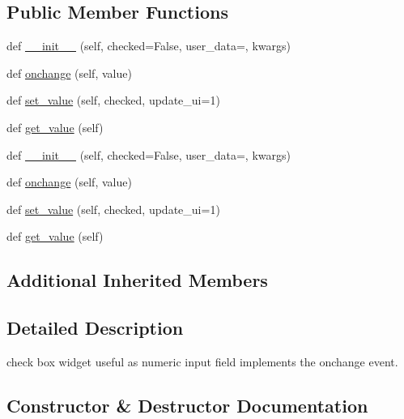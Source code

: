 \subsection*{Public Member Functions}
\begin{DoxyCompactItemize}
\item 
def \hyperlink{classremi_1_1gui_1_1CheckBox_a11912d6beb33eefc0ebc9f2c222b087f}{\+\_\+\+\_\+init\+\_\+\+\_\+} (self, checked=False, user\+\_\+data=\textquotesingle{}\textquotesingle{}, kwargs)
\item 
def \hyperlink{classremi_1_1gui_1_1CheckBox_aed8a3cd38f85743b5fc683c4797f4c97}{onchange} (self, value)
\item 
def \hyperlink{classremi_1_1gui_1_1CheckBox_a82f943b27590b9fb710095405b9107c8}{set\+\_\+value} (self, checked, update\+\_\+ui=1)
\item 
def \hyperlink{classremi_1_1gui_1_1CheckBox_a83ff74e6f93b02e36ee9262049064cbc}{get\+\_\+value} (self)
\item 
def \hyperlink{classremi_1_1gui_1_1CheckBox_a11912d6beb33eefc0ebc9f2c222b087f}{\+\_\+\+\_\+init\+\_\+\+\_\+} (self, checked=False, user\+\_\+data=\textquotesingle{}\textquotesingle{}, kwargs)
\item 
def \hyperlink{classremi_1_1gui_1_1CheckBox_aed8a3cd38f85743b5fc683c4797f4c97}{onchange} (self, value)
\item 
def \hyperlink{classremi_1_1gui_1_1CheckBox_a82f943b27590b9fb710095405b9107c8}{set\+\_\+value} (self, checked, update\+\_\+ui=1)
\item 
def \hyperlink{classremi_1_1gui_1_1CheckBox_a83ff74e6f93b02e36ee9262049064cbc}{get\+\_\+value} (self)
\end{DoxyCompactItemize}
\subsection*{Additional Inherited Members}


\subsection{Detailed Description}
\begin{DoxyVerb}check box widget useful as numeric input field implements the onchange event.\end{DoxyVerb}
 

\subsection{Constructor \& Destructor Documentation}
